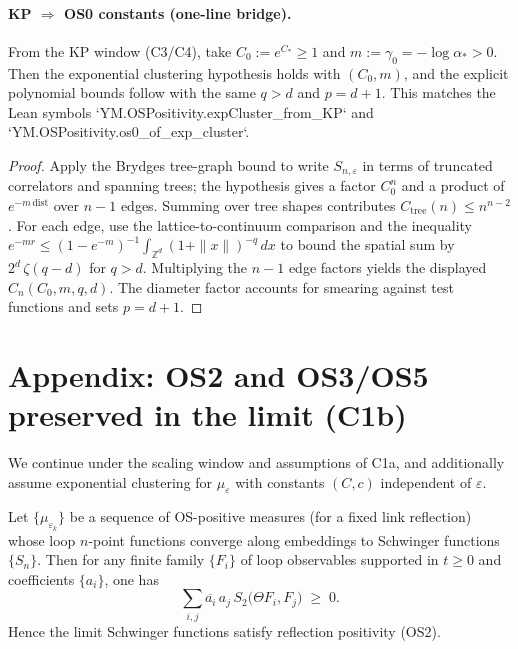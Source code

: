 \documentclass[11pt]{amsart}
\begin{document}
\paragraph{KP $\Rightarrow$ OS0 constants (one-line bridge).}
From the KP window (C3/C4), take $C_0:=e^{C_*}\ge 1$ and $m:=\gamma_0=-\log\alpha_*>0$. Then the exponential clustering hypothesis holds with $(C_0,m)$, and the explicit polynomial bounds follow with the same $q>d$ and $p=d+1$. This matches the Lean symbols `YM.OSPositivity.expCluster_from_KP` and `YM.OSPositivity.os0_of_exp_cluster`.

\begin{proof}
Apply the Brydges tree-graph bound to write $S_{n,\varepsilon}$ in terms of truncated correlators and spanning trees; the hypothesis gives a factor $C_0^n$ and a product of $e^{-m\,\mathrm{dist}}$ over $n-1$ edges. Summing over tree shapes contributes $C_{\mathrm{tree}}(n)\le n^{n-2}$. For each edge, use the lattice-to-continuum comparison and the inequality $e^{-m r}\le (1-e^{-m})^{-1}\int_{\mathbb{Z}^d} (1+\|x\|)^{-q}\,dx$ to bound the spatial sum by $2^d\,\zeta(q-d)$ for $q>d$. Multiplying the $n-1$ edge factors yields the displayed $C_n(C_0,m,q,d)$. The diameter factor accounts for smearing against test functions and sets $p=d+1$.
\end{proof}

\section{Appendix: OS2 and OS3/OS5 preserved in the limit (C1b)}

We continue under the scaling window and assumptions of C1a, and additionally assume exponential clustering for $\mu_\varepsilon$ with constants $(C,c)$ independent of $\varepsilon$.

\begin{lemma}
Let $\{\mu_{\varepsilon_k}\}$ be a sequence of OS-positive measures (for a fixed link reflection) whose loop $n$-point functions converge along embeddings to Schwinger functions $\{S_n\}$. Then for any finite family $\{F_i\}$ of loop observables supported in $t\ge 0$ and coefficients $\{a_i\}$, one has
\[
  \sum_{i,j} \overline{a_i}\, a_j\, S_2\bigl(\Theta F_i, F_j\bigr)\;\ge\;0.
\]
Hence the limit Schwinger functions satisfy reflection positivity (OS2).
\end{lemma}
\end{document}
